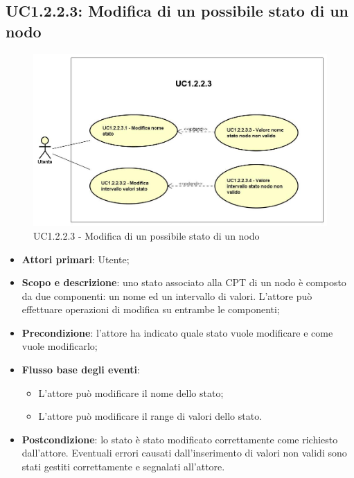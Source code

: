 \subsection{UC1.2.2.3: Modifica di un possibile stato di un nodo} 
\hypertarget{UC1.2.2.3}{} 
\begin{figure} [H]
	\centering
	\includegraphics[scale=0.45]{Img/UC1-2-2-3} 
	\caption{UC1.2.2.3 - Modifica di un possibile stato di un nodo} \label{} 
\end{figure} 
\begin{itemize} 
	\item{\textbf{Attori primari}: Utente;} 
	\item{\textbf{Scopo e descrizione}: uno stato associato alla CPT di un nodo è composto da due componenti: un nome ed un intervallo di valori. L'attore può effettuare operazioni di modifica su entrambe le componenti;} 
	\item{\textbf{Precondizione}: l'attore ha indicato quale stato vuole modificare e come vuole modificarlo;} 
	\item{\textbf{Flusso base degli eventi}: 
		\begin{itemize} 
			\item{L'attore può modificare il nome dello stato;} 
			\item{L'attore può modificare il range di valori dello stato.} 
		\end{itemize} 			
	} 
	\item{\textbf{Postcondizione}: lo stato è stato modificato correttamente come richiesto dall'attore. Eventuali errori causati dall'inserimento di valori non validi sono stati gestiti correttamente e segnalati all'attore.} 
\end{itemize} 

